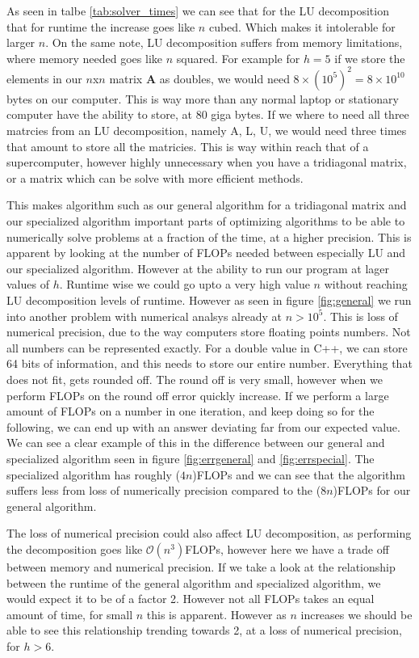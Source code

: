 \documentclass[10pt, a4paper]{amsart}
\begin{document}
As seen in talbe \ref{tab:solver_times} we can see that for the LU decomposition that for runtime the increase goes like $n$ cubed. Which makes it intolerable for larger $n$. On the same note, LU decomposition suffers from memory limitations, where memory needed goes like $n$ squared. For example for $h=5$ if we store the elements in our $n$x$n$ matrix $\mathbf{A}$ as doubles, we would need $8\times (10^5)^2 = 8 \times 10^10$ bytes on our computer. This is way more than any normal laptop or stationary computer have the ability to store, at $80$ giga bytes. If we where to need all three matrcies from an LU decomposition, namely A, L, U, we would need three times that amount to store all the matricies. This is way within reach that of a supercomputer\cite{OhioSupercomputerCenter1987}, however highly unnecessary when you have a tridiagonal matrix, or a matrix which can be solve with more efficient methods. 

This makes algorithm such as our general algorithm for a tridiagonal matrix and our specialized algorithm important parts of optimizing algorithms to be able to numerically solve problems at a fraction of the time, at a higher precision. This is apparent by looking at the number of FLOPs needed between especially LU and our specialized algorithm. However at the ability to run our program at lager values of $h$. Runtime wise we could go upto a very high value $n$ without reaching LU decomposition levels of runtime. However as seen in figure \ref{fig:general} we run into another problem with numerical analsys already at $n>10^5$. This is loss of numerical precision, due to the way computers store floating points numbers. Not all numbers can be represented exactly. For a double value in C++, we can store 64 bits of information, and this needs to store our entire number. Everything that does not fit, gets rounded off. The round off is very small, however when we perform FLOPs on the round off error quickly increase. If we perform a large amount of FLOPs on a number in one iteration, and keep doing so for the following, we can end up with an answer deviating far from our expected value. We can see a clear example of this in the difference between our general and specialized algorithm seen in figure \ref{fig:errgeneral} and \ref{fig:errspecial}. The specialized algorithm has roughly ($4n$)FLOPs and we can see that the algorithm suffers less from loss of numerically precision compared to the ($8n$)FLOPs for our general algorithm. 

The loss of numerical precision could also affect LU decomposition, as performing the decomposition goes like $\mathcal{O}(n^3)$FLOPs, however here we have a trade off between memory and numerical precision. If we take a look at the relationship between the runtime of the general algorithm and specialized algorithm, we would expect it to be of a factor 2. However not all FLOPs takes an equal amount of time, for small $n$ this is apparent. However as $n$ increases we should be able to see this relationship trending towards 2, at a loss of numerical precision, for $h>6$. 
\end{document}
